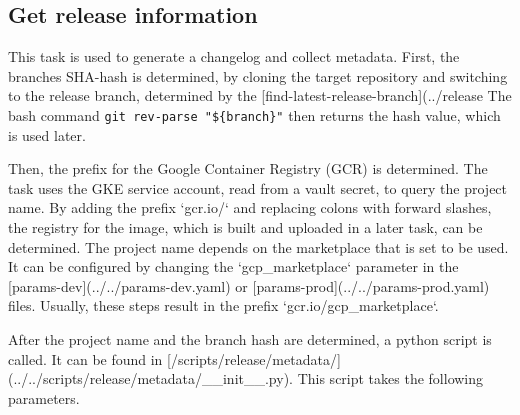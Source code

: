 \subsection{Get release information}\label{subsec:get-release-information}

This task is used to generate a changelog and collect metadata.
First, the branches SHA-hash is determined, by cloning the target repository and switching to the release branch, determined by the [find-latest-release-branch](../release%
The bash command \verb|git rev-parse "${branch}"| then returns the hash value, which is used later.

Then, the prefix for the Google Container Registry (GCR) is determined.
The task uses the GKE service account, read from a vault secret, to query the project name.
By adding the prefix `gcr.io/` and replacing colons with forward slashes, the registry for the image, which is built and uploaded in a later task, can be determined.
The project name depends on the marketplace that is set to be used.
It can be configured by changing the `gcp_marketplace` parameter in the [params-dev](../../params-dev.yaml) or [params-prod](../../params-prod.yaml) files.
Usually, these steps result in the prefix `gcr.io/{gcp_marketplace}`.

After the project name and the branch hash are determined, a python script is called.
It can be found in [/scripts/release/metadata/](../../scripts/release/metadata/__init__.py).
This script takes the following parameters.

